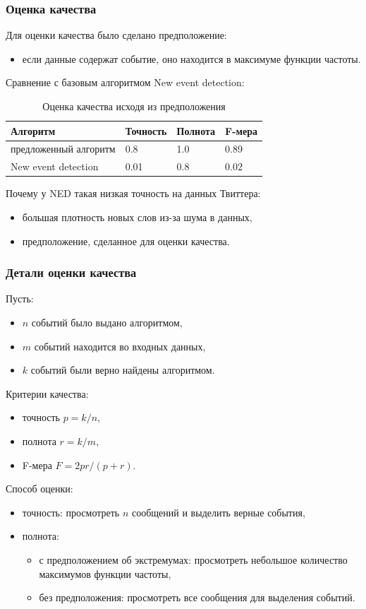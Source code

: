 \documentclass[10pt,pdf,hyperref={unicode}]{beamer}
\begin{document}
\begin{frame}
  \frametitle{Оценка качества}
  Для оценки качества было сделано предположение:
  \begin{itemize}
  \item если данные содержат событие, оно находится в максимуме функции частоты.
  \end{itemize}
  
  Сравнение с базовым алгоритмом New event detection:
  	\begin{table}[h]
	\centering
	\begin{tabular}{ l l l l}
	Алгоритм & Точность & Полнота & F-мера \\ \hline
	предложенный алгоритм  & 0.8 & 1.0 & 0.89 \\ 
	New event detection & 0.01 & 0.8 & 0.02 \\ 
	\end{tabular}
		\caption{Оценка качества исходя из предположения}
	\end{table}
	
	Почему у NED такая низкая точность на данных Твиттера:
	\begin{itemize}
	\item большая плотность новых слов из-за шума в данных,
	\item предположение, сделанное для оценки качества.
	\end{itemize}
	
\end{frame}

\begin{frame}
  \frametitle{Детали оценки качества}
  Пусть:
  \begin{itemize}
  \item $n$ событий было выдано алгоритмом,
  \item $m$ событий находится во входных данных,
  \item $k$ событий были верно найдены алгоритмом.
  \end{itemize}
  
  Критерии качества:
  \begin{itemize}
  \item точность $p = k/n$,
  \item полнота $r = k/m$,
  \item F-мера $F = 2pr/(p+r)$.
  \end{itemize}
  
  Способ оценки:
  \begin{itemize}
  \item точность: просмотреть $n$ сообщений и выделить верные события,
  \item полнота: 
  \begin{itemize}
  \item с предположением об экстремумах: просмотреть небольшое количество максимумов функции частоты,
  \item без предположения: просмотреть все сообщения для выделения событий.
  \end{itemize}
  \end{itemize}
  
\end{frame}
\end{document}
